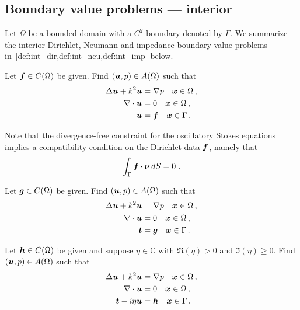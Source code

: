 \subsection{Boundary value problems --- interior}

Let $\Omega$ be a bounded domain with a $C^2$ boundary
denoted by $\Gamma$.
We summarize the interior Dirichlet, Neumann and impedance
boundary value problems in~\cref{def:int_dir,def:int_neu,def:int_imp} below.

\begin{definition}
  \label{def:int_dir}
  Let ${\boldsymbol f} \in C(\Omega)$ be given. Find $({\boldsymbol u},p) \in A(\Omega)$
  such that
  \begin{equation}
  \begin{aligned} \label{eq:dir_interior}
    \Delta {\boldsymbol u} + k^{2} {\boldsymbol u} &= \nabla p \quad {\boldsymbol x} \in \Omega \, ,\\
    \nabla \cdot {\boldsymbol u} &= 0 \quad {\boldsymbol x} \in \Omega \, ,  \\
    {\boldsymbol u} &= {\boldsymbol f} \quad {\boldsymbol x} \in \Gamma \, .
  \end{aligned}
  \end{equation}
\end{definition}
Note that the divergence-free constraint for the oscillatory
Stokes equations implies a compatibility condition on the
Dirichlet data ${\boldsymbol f}$, namely that
\begin{equation} \label{eq:dir_compat}
  \int_\Gamma {\boldsymbol f} \cdot {\boldsymbol \nu} \, dS = 0 \; .
\end{equation}


\begin{definition}
  \label{def:int_neu}
  Let ${\boldsymbol g} \in C(\Omega)$ be given. Find $({\boldsymbol u},p) \in A(\Omega)$
  such that
  \begin{equation}
  \begin{aligned} \label{eq:neu_interior}
    \Delta {\boldsymbol u} + k^{2} {\boldsymbol u} &= \nabla p \quad {\boldsymbol x} \in \Omega \, ,\\
    \nabla \cdot {\boldsymbol u} &= 0 \quad {\boldsymbol x} \in \Omega \, ,  \\
    {\boldsymbol t} &= {\boldsymbol g} \quad {\boldsymbol x} \in \Gamma \, .
  \end{aligned}
  \end{equation}
\end{definition}

\begin{definition}
\label{def:int_imp}
  Let ${\boldsymbol h} \in C(\Omega)$ be given and suppose 
  $\eta \in \mathbb{C}$ with $\Re{(\eta)} >0$ and $\Im{(\eta)}\ge 0$. 
  Find $({\boldsymbol u},p) \in A(\Omega)$  such that
  \begin{equation}
  \begin{aligned} \label{eq:imp_interior}
    \Delta {\boldsymbol u} + k^{2} {\boldsymbol u} &= \nabla p \quad {\boldsymbol x} \in \Omega \, ,\\
    \nabla \cdot {\boldsymbol u} &= 0 \quad {\boldsymbol x} \in \Omega \, ,  \\
    {\boldsymbol t} - i \eta {\boldsymbol u} &= {\boldsymbol h} \quad {\boldsymbol x} \in \Gamma \, .
  \end{aligned}
  \end{equation}
\end{definition}

